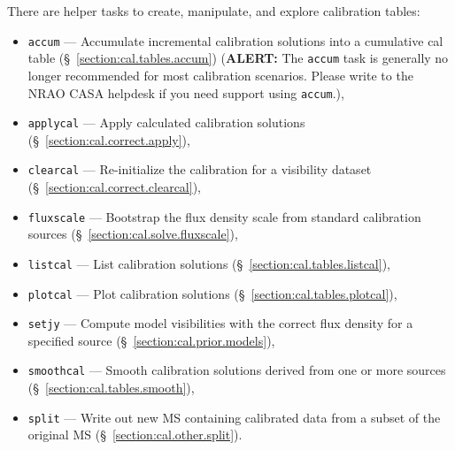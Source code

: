 There are helper tasks to create, manipulate, and explore calibration 
tables:
\begin{itemize}
   \item {\tt accum} --- Accumulate incremental calibration solutions
      into a cumulative cal table (\S~\ref{section:cal.tables.accum})
      ({\bf ALERT:} The {\tt accum} task is generally no longer recommended
      for most calibration scenarios.  Please write to the NRAO CASA
      helpdesk  if you need support using {\tt accum}.),
   \item {\tt applycal} --- Apply calculated calibration solutions
      (\S~\ref{section:cal.correct.apply}),
   \item {\tt clearcal} --- Re-initialize the calibration for a
     visibility dataset (\S~\ref{section:cal.correct.clearcal}),
   \item {\tt fluxscale} --- Bootstrap the flux density scale from
      standard calibration sources (\S~\ref{section:cal.solve.fluxscale}), 
   \item {\tt listcal} --- List calibration solutions 
      (\S~\ref{section:cal.tables.listcal}),
   \item {\tt plotcal} --- Plot calibration solutions 
      (\S~\ref{section:cal.tables.plotcal}),
    \item {\tt setjy} --- Compute model visibilities with the correct
      flux density for a specified source
      (\S~\ref{section:cal.prior.models}),
   \item {\tt smoothcal} --- Smooth calibration solutions derived from
      one or more sources (\S~\ref{section:cal.tables.smooth}),
   \item {\tt split} --- Write out new MS containing calibrated data
      from a subset of the original MS (\S~\ref{section:cal.other.split}).
\end{itemize}

